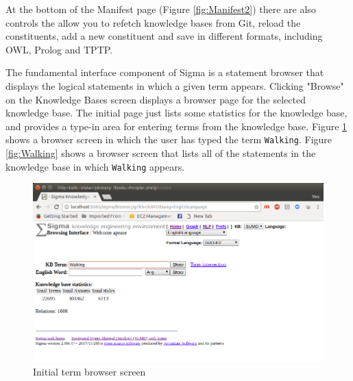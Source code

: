 \documentclass{book}
\begin{document}
At the bottom of the Manifest page (Figure
\ref{fig:Manifest2}) there are also controls the allow you to
refetch knowledge bases from Git, reload the constituents, add a new
constituent and save in different formats, including OWL, Prolog and TPTP.

The fundamental interface component of Sigma is a statement browser that
displays the logical statements in which a given term appears.  Clicking
"Browse" on the Knowledge Bases screen displays a browser page for
the selected knowledge base.  The initial page just lists some statistics for the knowledge
base, and provides a type-in area for entering terms from the knowledge base.
Figure \ref{fig:TermBrowse} shows a browser screen in which the user has typed
the term {\tt Walking}.  Figure \ref{fig:Walking} shows a browser screen that
lists all of the statements in the knowledge base in which {\tt Walking}
appears.

\begin{figure}
  \centering
  \includegraphics[width=4.5in]{pictures/TermBrowse.png}
  \caption{Initial term browser screen}
  \label{fig:TermBrowse}
\end{figure}
\end{document}
